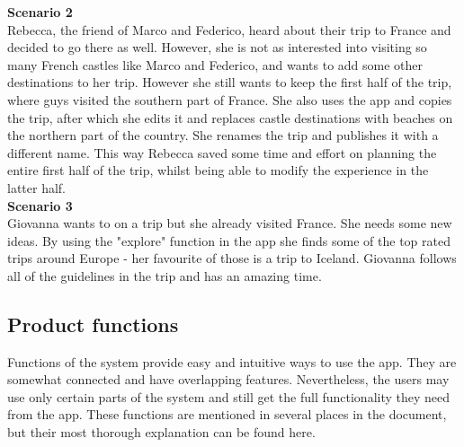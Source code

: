 \textbf{Scenario 2}\\

\hspace{\parindent}Rebecca, the friend of Marco and Federico, heard about their trip to France and decided to go there as well. However, she is not as interested into visiting so many French castles like Marco and Federico, and wants to add some other destinations to her trip. However she still wants to keep the first half of the trip, where guys visited the southern part of France. She also uses the app and copies the trip, after which she edits it and replaces castle destinations with beaches on the northern part of the country. She renames the trip and publishes it with a different name. This way Rebecca saved some time and effort on planning the entire first half of the trip, whilst being able to modify the experience in the latter half.\\

\textbf{Scenario 3}\\

\hspace{\parindent}Giovanna wants to on a trip but she already visited France. She needs some new ideas. By using the "explore" function in the app she finds some of the top rated trips around Europe - her favourite of those is a trip to Iceland. Giovanna follows all of the guidelines in the trip and has an amazing time.\\

\subsection{Product functions}
\hspace{\parindent}Functions of the system provide easy and intuitive ways to use the app. They are somewhat connected and have overlapping features. Nevertheless, the users may use only certain parts of the system and still get the full functionality they need from the app.
These functions are mentioned in several places in the document, but their most thorough explanation can be found here.
